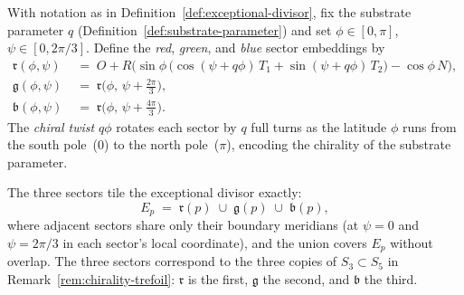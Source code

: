\begin{definition}
\label{def:chiral-sector-coords}
With notation as in Definition~\ref{def:exceptional-divisor}, fix the
substrate parameter $q$ (Definition~\ref{def:substrate-parameter}) and set
$\phi \in [0,\pi]$, $\psi \in [0, 2\pi/3]$.  Define the
\emph{red}, \emph{green}, and \emph{blue} sector embeddings by
\begin{align*}
  \mathfrak{r}(\phi,\psi)
  &\;=\; O + R\bigl(\sin\phi\,\bigl(\cos(\psi + q\phi)\,T_1
         + \sin(\psi + q\phi)\,T_2\bigr) - \cos\phi\,N\bigr),\\
  \mathfrak{g}(\phi,\psi)
  &\;=\; \mathfrak{r}\!\bigl(\phi,\,\psi + \tfrac{2\pi}{3}\bigr),\\
  \mathfrak{b}(\phi,\psi)
  &\;=\; \mathfrak{r}\!\bigl(\phi,\,\psi + \tfrac{4\pi}{3}\bigr).
\end{align*}
The \emph{chiral twist} $q\phi$ rotates each sector by $q$ full turns as
the latitude $\phi$ runs from the south pole~($0$) to the north pole~($\pi$),
encoding the chirality of the substrate parameter.

The three sectors tile the exceptional divisor exactly:
\[
  E_p \;=\; \mathfrak{r}(p) \;\cup\; \mathfrak{g}(p) \;\cup\; \mathfrak{b}(p),
\]
where adjacent sectors share only their boundary meridians
(at $\psi = 0$ and $\psi = 2\pi/3$ in each sector's local coordinate),
and the union covers $E_p$ without overlap.  The three sectors correspond to
the three copies of $S_3 \subset S_5$ in
Remark~\ref{rem:chirality-trefoil}: $\mathfrak{r}$ is the first, $\mathfrak{g}$ the
second, and $\mathfrak{b}$ the third.
\end{definition}


